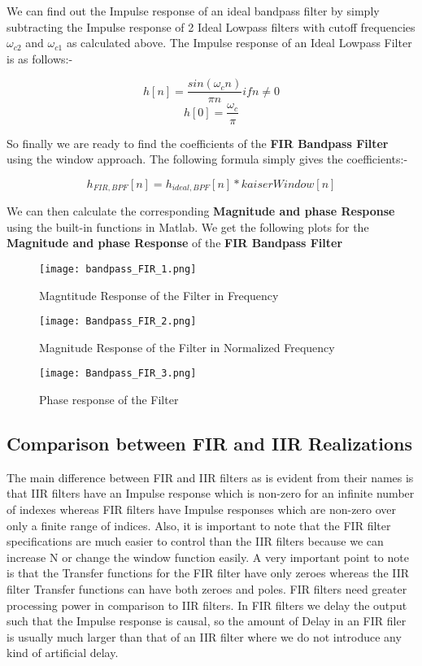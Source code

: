 \documentclass[12pt]{article}
\begin{document}
We can find out the Impulse response of an ideal bandpass filter by simply subtracting the Impulse response of 2 Ideal Lowpass filters with cutoff frequencies $\omega_{c2}$ and $\omega_{c1}$ as calculated above. The Impulse response of an Ideal Lowpass Filter is as follows:- 

\[h[n] = \frac{sin(\omega_{c}n)}{\pi n} if n \neq 0\]
\[h[0] = \frac{\omega_{c}}{\pi}\]

So finally we are ready to find the coefficients of the \textbf{FIR Bandpass Filter} using the window approach.
The following formula simply gives the coefficients:-

\[h_{FIR,BPF}[n] = h_{ideal,BPF}[n]*kaiserWindow[n]\]

We can then calculate the corresponding \textbf{Magnitude and phase Response} using the built-in functions in Matlab. We get the following plots for the \textbf{Magnitude and phase Response} of the \textbf{FIR Bandpass Filter}

\newpage

\begin{figure}[H]
    \centering
    \texttt{[image: bandpass\_FIR\_1.png]}
    \caption{Magntitude Response of the Filter in Frequency}
\end{figure}

\begin{figure}[H]
    \centering
    \texttt{[image: Bandpass\_FIR\_2.png]}
    \caption{Magnitude Response of the Filter in Normalized Frequency}
\end{figure}

\begin{figure}[H]
    \centering
    \texttt{[image: Bandpass\_FIR\_3.png]}
    \caption{Phase response of the Filter}
\end{figure}

\subsection{Comparison between FIR and IIR Realizations}
The main difference between FIR and IIR filters as is evident from their names is that IIR filters have an Impulse response which is non-zero for an infinite number of indexes whereas FIR filters have Impulse responses which are non-zero over only a finite range of indices.
Also, it is important to note that the FIR filter specifications are much easier to control than the IIR filters because we can increase N or change the window function easily. A very important point to note is that the Transfer functions for the FIR filter have only zeroes whereas the IIR filter Transfer functions can have both zeroes and poles. FIR filters need greater processing power in comparison to IIR filters. In FIR filters we delay the output such that the Impulse response is causal, so the amount of Delay in an FIR filer is usually much larger than that of an IIR filter where we do not introduce any kind of artificial delay.
\end{document}
